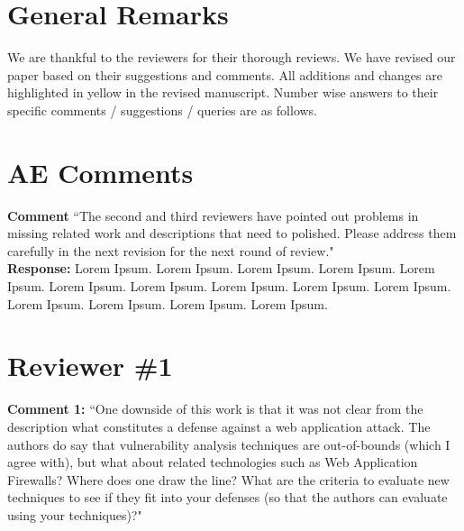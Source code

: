 \documentclass[10pt,journal,compsoc]{IEEEtran}
\begin{document}
\maketitle

\IEEEdisplaynontitleabstractindextext

\IEEEpeerreviewmaketitle

\section{General Remarks}
\label{sec:rem}

We are thankful to the reviewers for their thorough reviews.
We have revised our paper based on their suggestions and comments.
All additions and changes are highlighted in yellow
in the revised manuscript.
Number wise answers to their specific
comments / suggestions / queries are as follows.

\section{AE Comments}
\label{sec:ae}

{\bf Comment} ``The second and third reviewers
have pointed out problems in missing related work and
descriptions that need to polished.
Please address them carefully in the next revision
for the next round of review."\\

\noindent
{\bf Response:}
Lorem Ipsum. Lorem Ipsum. Lorem Ipsum. Lorem Ipsum. Lorem Ipsum. Lorem Ipsum. Lorem Ipsum. Lorem Ipsum. Lorem Ipsum. Lorem Ipsum. Lorem Ipsum. Lorem Ipsum. Lorem Ipsum. Lorem Ipsum.\\

\section{Reviewer \#1}
\label{sec:r1}

{\bf Comment 1:} ``One downside of this work is that it was not clear from the
description what constitutes a defense against a web application
attack. The authors do say that vulnerability analysis techniques are
out-of-bounds (which I agree with), but what about related
technologies such as Web Application Firewalls? Where does one draw
the line? What are the criteria to evaluate new techniques to see if
they fit into your defenses (so that the authors can evaluate using
your techniques)?"\\
\end{document}
